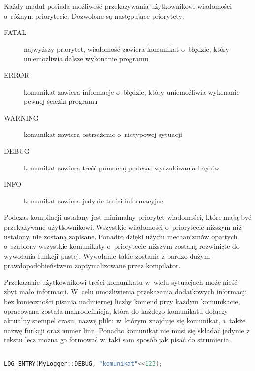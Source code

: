 Każdy moduł posiada możliwość przekazywania użytkownikowi wiadomości
o~różnym priorytecie. Dozwolone są następujące priorytety:

\begin{description}
\item[FATAL] najwyższy priorytet, wiadomość zawiera komunikat
  o~błędzie, który uniemożliwia dalsze wykonanie programu
\item[ERROR] komunikat zawiera informacje o~błędzie, który
  uniemożliwia wykonanie pewnej ścieżki programu
\item[WARNING] komunikat zawiera ostrzeżenie o~nietypowej sytuacji
\item[DEBUG] komunikat zawiera treść pomocną podczas wyszukiwania błędów
\item[INFO] komunikat zawiera jedynie treści informacyjne
\end{description}

Podczas kompilacji ustalany jest minimalny priorytet wiadomości, które
mają być przekazywane użytkownikowi. Wszystkie wiadomości
o~priorytecie niższym niż ustalony, nie zostaną zapisane. Ponadto
dzięki użyciu mechanizmów opartych o~szablony wszystkie komunikaty
o~priorytecie niższym zostaną rozwinięte do wywołania funkcji
pustej. Wywołanie takie zostanie z bardzo dużym prawdopodobieństwem
zoptymalizowane przez kompilator.

Przekazanie użytkownikowi treści komunikatu w~wielu sytuacjach może
nieść zbyt mało informacji. W~celu umożliwienia przekazania
dodatkowych informacji bez konieczności pisania nadmiernej liczby
komend przy każdym komunikacie, opracowana została makrodefinicja,
która do każdego komunikatu dołączy aktualny stempel czasu, nazwę
pliku w~którym znajduje się komunikat, a~także nazwę funkcji oraz
numer linii. Ponadto komunikat nie musi się składać jedynie z tekstu
lecz można go formować w~taki sam sposób jak pisać do strumienia.

\vspace{0.5cm}
\begin{minipage}{\textwidth}
  \begin{lstlisting}[language=c++, breaklines=true,
    linewidth=0.99\textwidth, caption=Przykładowe wypisanie
    komunikatu]

LOG_ENTRY(MyLogger::DEBUG, "komunikat"<<123);

\end{lstlisting}
\end{minipage}
\vspace{0.5cm}

